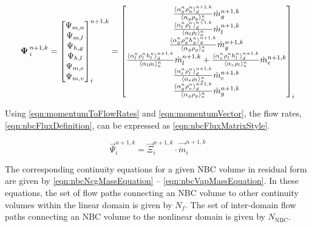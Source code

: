 \begin{equation}
\label{eqn:nbcFluxDefinition}
\vec{\Psi}^{n+1, k}_{i} = \begin{bmatrix}
\Psi_{m, n} \\
\Psi_{m, l} \\
\Psi_{h, g} \\
\Psi_{h, l} \\
\Psi_{m, e} \\
\Psi_{m, v} \\
\end{bmatrix}^{n+1, k}_{i} = \begin{bmatrix}
\frac{\don{\alpha^{n}_{g} \rho^{n}_{n}}^{n+1,k}_{d}}{\ave{\alpha_{g} \rho_{g}}^{n}_{a}}\dot{m}^{n+1,k}_{g} \\
%
\frac{\don{\alpha^{n}_{l}\rho^{n}_{l}}^{n+1,k}_{d}}{\ave{\alpha_{l} \rho_{l}}^{n}_{a}}\dot{m}^{n+1,k}_{l}\\
%
\frac{\don{\alpha^{n}_{g} \rho^{n}_{g} h^{n}_{g}}^{n+1,k}_{d}}{\ave{\alpha_{g} \rho_{g}}^{n}_{a}}\dot{m}^{n+1, k}_{g}\\
%
\frac{\don{\alpha^{n}_{l}\rho^{n}_{l} h^{n}_{l}}^{n+1,k}_{d}}{\ave{\alpha_{l} \rho_{l}}^{n}_{a}}\dot{m}^{n+1, k}_{l} +\frac{\don{\alpha^{n}_{e} \rho^{n}_{l} h^{n}_{l}}^{n+1, k}_{d}}{\ave{\alpha_{e} \rho_{l}}^{n}_{a}}\dot{m}^{n+1, k}_{e} \\
%
\frac{ \don{\alpha^{n}_{e} \rho^{n}_{l}}^{n+1, k}_{d}}{ \ave{\alpha_{e} \rho_{l}}^{n}_{a}} \dot{m}^{n+1, k}_{e} \\
%
\frac{ \don{\alpha^{n}_{g} \rho^{n}_{v}}^{n+1, k}_{d}}{ \ave{\alpha_{g} \rho_{g}}^{n}_{a}} \dot{m}^{n+1, k}_{g}
\end{bmatrix}_{i}
\end{equation}

Using \eqref{eqn:momentumToFlowRates} and \eqref{eqn:momentumVector}, the flow rates, \eqref{eqn:nbcFluxDefinition}, can be expressed as \eqref{eqn:nbcFluxMatrixStyle}.

\begin{equation}
\label{eqn:nbcFluxMatrixStyle}
\vec{\Psi}^{n+1, k}_{i} = \vec{\Xi}^{n+1, k}_{i} \cdot \vec{\dot{m}}^{n+1, k}_{i}
\end{equation}

The corresponding continuity equations for a given NBC volume in residual form are given by \eqref{eqn:nbcNcgMassEquation} -- \eqref{eqn:nbcVapMassEquation}.
In these equations, the set of flow paths connecting an NBC volume to other continuity volumes within the linear domain is given by $N_{f}$.
The set of inter-domain flow paths connecting an NBC volume to the nonlinear domain is given by $N_{\text{NBC}}$.

